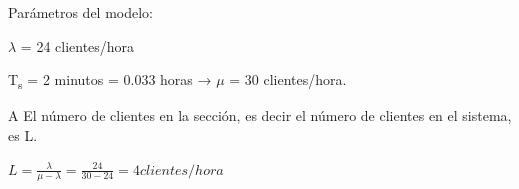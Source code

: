 \documentclass[a4paper,11pt]{article}
\begin{document}
\vspace{27pt}
Parámetros del modelo:

$\lambda$ = 24 clientes/hora

T\textsubscript{s} = 2 minutos = 0.033 horas → $\mu$ = 30 clientes/hora.

\vspace{13pt}
A  El número de clientes en la sección, es decir el número de clientes en el 
sistema, es L.

$L = \frac{\lambda}{\mu - \lambda} = \frac{24}{30 - 24} = 4 clientes/hora$
\end{document}
